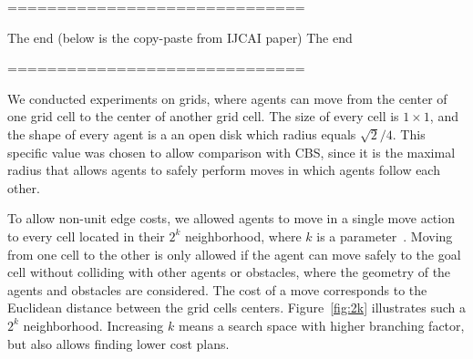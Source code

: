 \documentclass[review]{elsarticle}
\newcommand\roni[1]{\nb{\textbf{Roni:}}{green}{#1}}
\newcommand{\cbs}{\ac{CBS}\xspace}
\begin{document}
==============================

The end (below is the copy-paste from IJCAI paper) The end

==============================




We conducted experiments on grids, where agents can move from the center of one grid cell 
to the center of another grid cell. 
The size of every cell is $1\times 1$, and 
the shape of every agent is a an open disk which radius equals $\sqrt{2}/4$. This specific value was chosen to allow comparison with \cbs, since it is the maximal radius that allows agents to safely perform moves in which agents follow each other.




To allow non-unit edge costs, we allowed agents to move in a single move action to every cell located in their $2^k$ neighborhood, where $k$ is a parameter~\cite{rivera2017grid}. Moving from one cell to the other is only allowed if the agent can move safely to the goal cell without colliding with other agents or obstacles, where the geometry of the agents and obstacles are considered. The cost of a move corresponds to the Euclidean distance between the grid cells centers.  Figure~\ref{fig:2k} illustrates such a $2^k$ neighborhood. Increasing $k$ means a search space with higher branching factor, but also allows finding lower cost plans. 
\end{document}
